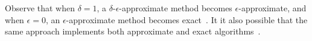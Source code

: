 
Observe that when $\delta = 1$, a $\delta$-$\epsilon$-approximate method becomes $\epsilon$-approximate, and when $\epsilon=0$, an $\epsilon$-approximate method becomes exact~\cite{conf/icde/Ciaccia2000}.
It it also possible that the same approach implements both approximate and exact algorithms~\cite{conf/kdd/shieh1998,conf/vldb/Wang2013,journal/kais/Camerra2014,journal/vldb/Zoumpatianos2016,journal/edbt/Schafer2012}. 

